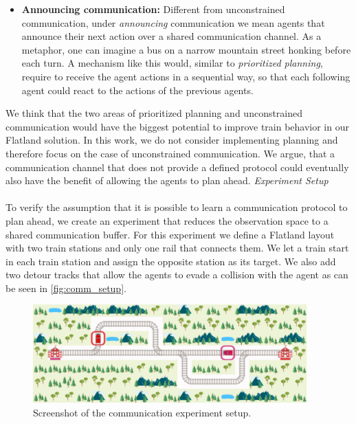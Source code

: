 \begin{itemize}
	\item \textbf{Announcing communication:} Different from unconstrained communication, under \textit{announcing} communication we mean agents that announce their next action over a shared communication channel. As a metaphor, one can imagine a bus on a narrow mountain street honking before each turn. A mechanism like this would, similar to \textit{prioritized planning}, require to receive the agent actions in a sequential way, so that each following agent could react to the actions of the previous agents.
\end{itemize}

We think that the two areas of prioritized planning and unconstrained communication would have the biggest potential to improve train behavior in our Flatland solution. In this work, we do not consider implementing planning and therefore focus on the case of unconstrained communication. We argue, that a communication channel that does not provide a defined protocol could eventually also have the benefit of allowing the agents to plan ahead.
\newpage
\textit{Experiment Setup}\\\\
To verify the assumption that it is possible to learn a communication protocol to plan ahead, we create an experiment that reduces the observation space to a shared communication buffer. For this experiment we define a Flatland layout with two train stations and only one rail that connects them. We let a train start in each train station and assign the opposite station as its target. We also add two detour tracks that allow the agents to evade a collision with the agent as can be seen in \autoref{fig:comm_setup}.

\begin{figure}[H]
	\centering
	\includegraphics[width=300pt]{images/communication_experiment.png}
	\caption{Screenshot of the communication experiment setup.}
	\label{fig:comm_setup}
\end{figure}


